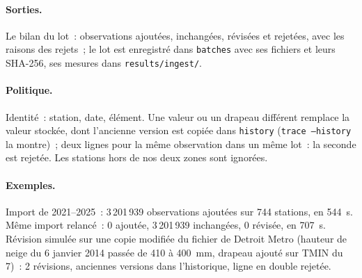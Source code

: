 \paragraph{Sorties.} Le bilan du lot~: observations ajoutées, inchangées, révisées et rejetées, avec les raisons des rejets~; le lot est enregistré dans \texttt{batches} avec ses fichiers et leurs SHA-256, ses mesures dans \texttt{results/ingest/}.
\paragraph{Politique.} Identité~: station, date, élément. Une valeur ou un drapeau différent remplace la valeur stockée, dont l'ancienne version est copiée dans \texttt{history} (\texttt{trace --history} la montre)~; deux lignes pour la même observation dans un même lot~: la seconde est rejetée. Les stations hors de nos deux zones sont ignorées.
\paragraph{Exemples.} Import de 2021--2025~: 3\,201\,939 observations ajoutées sur 744 stations, en 544~s. Même import relancé~: 0 ajoutée, 3\,201\,939 inchangées, 0 révisée, en 707~s. Révision simulée sur une copie modifiée du fichier de Detroit Metro (hauteur de neige du 6 janvier 2014 passée de 410 à 400~mm, drapeau ajouté sur TMIN du 7)~: 2 révisions, anciennes versions dans l'historique, ligne en double rejetée.
